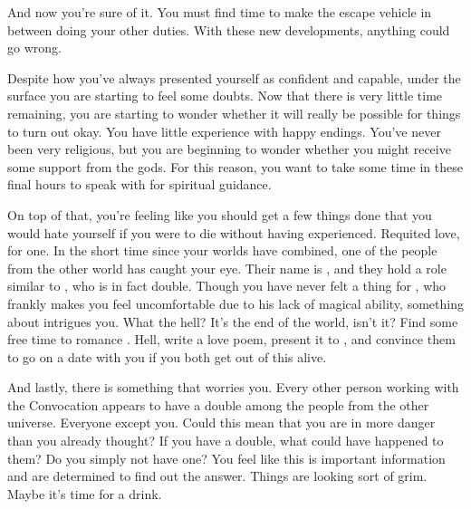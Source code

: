 \documentclass[char]{guildcamp3}
\begin{document}
And now you're sure of it. You must find time to make the escape vehicle in between doing your other duties. With these new developments, anything could go wrong.

Despite how you've always presented yourself as confident and capable, under the surface you are starting to feel some doubts. Now that there is very little time remaining, you are starting to wonder whether it will really be possible for things to turn out okay. You have little experience with happy endings. You've never been very religious, but you are beginning to wonder whether you might receive some support from the gods. For this reason, you want to take some time in these final hours to speak with \cPaladin{} for spiritual guidance.

On top of that, you're feeling like you should get a few things done that you would hate yourself if you were to die without having experienced. Requited love, for one. In the short time since your worlds have combined, one of the people from the other world has caught your eye. Their name is \cPoliOne{}, and they hold a role similar to \cNobleOne{}, who is in fact \cPoliOne{\their} double. Though you have never felt a thing for \cNobleOne{}, who frankly makes you feel uncomfortable due to his lack of magical ability, something about \cPoliOne{} intrigues you. What the hell? It's the end of the world, isn't it? Find some free time to romance \cPoliOne{\them}. Hell, write \cPoliOne{\them} a love poem, present it to \cPoliOne{\them}, and convince them to go on a date with you if you both get out of this alive. 

And lastly, there is something that worries you. Every other person working with the Convocation appears to have a double among the people from the other universe. Everyone except you. Could this mean that you are in more danger than you already thought? If you have a double, what could have happened to them? Do you simply not have one? You feel like this is important information and are determined to find out the answer. Things are looking sort of grim. Maybe it's time for a drink.
\end{document}

